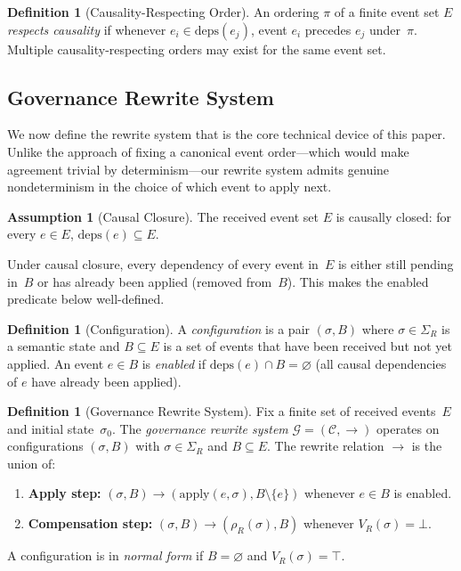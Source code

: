 \documentclass[11pt,a4paper]{article}
\theoremstyle{plain}
\theoremstyle{definition}
\newtheorem{definition}[theorem]{Definition}
\newtheorem{assumption}[theorem]{Assumption}
\theoremstyle{remark}
\begin{document}
\begin{definition}[Causality-Respecting Order]
\label{def:causal-order}
An ordering $\pi$ of a finite event set $E$ \emph{respects causality} if
whenever $e_i \in \mathrm{deps}(e_j)$, event $e_i$ precedes $e_j$
under~$\pi$.  Multiple causality-respecting orders may exist for the same
event set.
\end{definition}

\subsection{Governance Rewrite System}

We now define the rewrite system that is the core technical device of this
paper.  Unlike the approach of fixing a canonical event order---which would make
agreement trivial by determinism---our rewrite system admits genuine
nondeterminism in the choice of which event to apply next.

\begin{assumption}[Causal Closure]
\label{as:closure}
The received event set $E$ is causally closed: for every $e \in E$,
$\mathrm{deps}(e) \subseteq E$.
\end{assumption}

Under causal closure, every dependency of every event in~$E$ is either still
pending in~$B$ or has already been applied (removed from~$B$).  This makes the
enabled predicate below well-defined.

\begin{definition}[Configuration]
\label{def:config}
A \emph{configuration} is a pair $(\sigma, B)$ where $\sigma \in \Sigma_R$ is
a semantic state and $B \subseteq E$ is a set of events that have been
received but not yet applied.  An event $e \in B$ is \emph{enabled} if
$\mathrm{deps}(e) \cap B = \varnothing$ (all causal dependencies of $e$ have
already been applied).
\end{definition}

\begin{definition}[Governance Rewrite System]
\label{def:grs}
Fix a finite set of received events~$E$ and initial state~$\sigma_0$.  The
\emph{governance rewrite system} $\mathcal{G} = (\mathcal{C}, \to)$ operates
on configurations $(\sigma, B)$ with $\sigma \in \Sigma_R$ and
$B \subseteq E$.  The rewrite relation $\to$ is the union of:
\begin{enumerate}[leftmargin=*,nosep]
\item \textbf{Apply step:}
  $(\sigma, B) \to (\mathrm{apply}(e, \sigma), B \setminus \{e\})$ whenever
  $e \in B$ is enabled.
\item \textbf{Compensation step:}
  $(\sigma, B) \to (\rho_R(\sigma), B)$ whenever $V_R(\sigma) = \bot$.
\end{enumerate}
A configuration is in \emph{normal form} if $B = \varnothing$ and
$V_R(\sigma) = \top$.
\end{definition}
\end{document}
